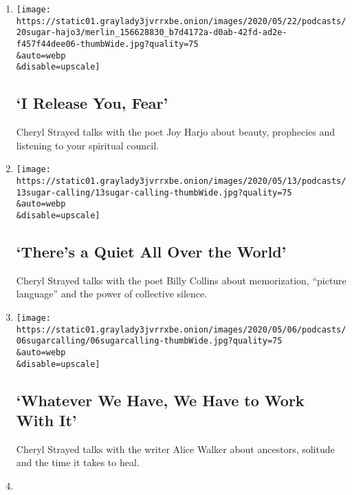 \begin{enumerate}
\def\labelenumi{\arabic{enumi}.}
\item
  \href{/2020/05/20/podcasts/sugar-calling-joy-harjo-poetry-virus.html}{}

  \texttt{[image: https://static01.graylady3jvrrxbe.onion/images/2020/05/22/podcasts/20sugar-hajo3/merlin\_156628830\_b7d4172a-d0ab-42fd-ad2e-f457f44dee06-thumbWide.jpg?quality=75\\\&auto=webp\\\&disable=upscale]}

  \hypertarget{i-release-you-fear}{%
  \subsection{`I Release You, Fear'}\label{i-release-you-fear}}

  Cheryl Strayed talks with the poet Joy Harjo about beauty, prophecies
  and listening to your spiritual council.
\item
  \href{/2020/05/13/podcasts/sugar-calling-billy-collins-poetry-virus.html}{}

  \texttt{[image: https://static01.graylady3jvrrxbe.onion/images/2020/05/13/podcasts/13sugar-calling/13sugar-calling-thumbWide.jpg?quality=75\\\&auto=webp\\\&disable=upscale]}

  \hypertarget{theres-a-quiet-all-over-the-world}{%
  \subsection{`There's a Quiet All Over the
  World'}\label{theres-a-quiet-all-over-the-world}}

  Cheryl Strayed talks with the poet Billy Collins about memorization,
  ``picture language'' and the power of collective silence.
\item
  \href{/2020/05/06/podcasts/sugar-calling-alice-walker-quarantine-virus.html}{}

  \texttt{[image: https://static01.graylady3jvrrxbe.onion/images/2020/05/06/podcasts/06sugarcalling/06sugarcalling-thumbWide.jpg?quality=75\\\&auto=webp\\\&disable=upscale]}

  \hypertarget{whatever-we-have-we-have-to-work-with-it}{%
  \subsection{`Whatever We Have, We Have to Work With
  It'}\label{whatever-we-have-we-have-to-work-with-it}}

  Cheryl Strayed talks with the writer Alice Walker about ancestors,
  solitude and the time it takes to heal.
\item
  \href{/2020/04/29/podcasts/sugar-calling-judy-blume-quarantine-virus.html}{}


\end{enumerate}
